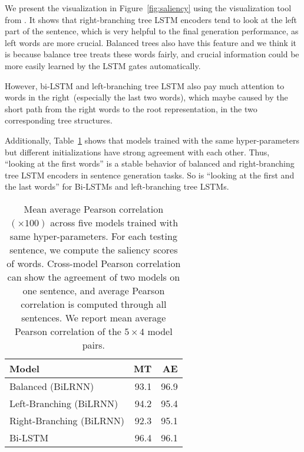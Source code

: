 \documentclass[11pt,a4paper]{article}
\begin{document}
We present the visualization in Figure~\ref{fig:saliency} using the visualization tool from .
It shows that right-branching tree LSTM encoders tend to look at the left part of the sentence, which is very helpful to the final generation performance, as left words are more crucial.
Balanced trees also have this feature and we think it is because balance tree treats these words fairly, and crucial information could be more easily learned by the LSTM gates automatically.

However, bi-LSTM and left-branching tree LSTM also pay much attention to words in the right~(especially the last two words), which maybe caused by the short path from the right words to the root representation, in the two corresponding tree structures. 

Additionally, Table~\ref{table:pearson} shows that models trained with the same hyper-parameters but different initializations have strong agreement with each other. 
Thus, ``looking at the first words'' is a stable behavior of balanced and right-branching tree LSTM encoders in sentence generation tasks. So is ``looking at the first and the last words'' for Bi-LSTMs and left-branching tree LSTMs.


\begin{table}[t]
    \centering
    \begin{tabular}{lrr}
         \toprule
         \textbf{Model} & \textbf{MT} & \textbf{AE} \\
         \midrule
         Balanced (BiLRNN)  & 93.1  & 96.9 \\
         Left-Branching (BiLRNN) & 94.2 & 95.4 \\
         Right-Branching (BiLRNN) & 92.3 & 95.1 \\
         Bi-LSTM            & 96.4  & 96.1 \\
         \bottomrule
    \end{tabular}
    \caption{\label{table:pearson} Mean average Pearson correlation $(\times 100)$ across five models trained with same hyper-parameters. For each testing sentence, we compute the saliency scores of words. Cross-model Pearson correlation can show the agreement of two models on one sentence, and average Pearson correlation is computed through all sentences. We report mean average Pearson correlation of the $5 \times 4$ model pairs. }
\end{table}
\end{document}
